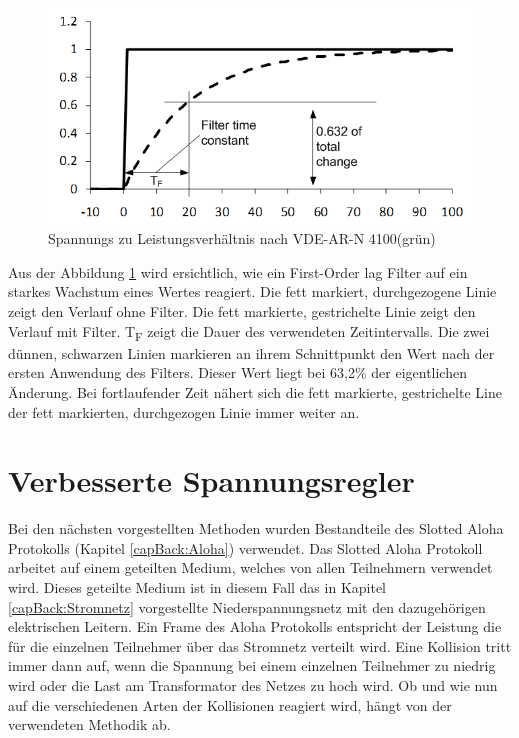 \begin{figure}[htb]
	\includegraphics[scale=0.75]{img/lag_Filter.png}
	\caption{Spannungs zu Leistungsverhältnis nach VDE-AR-N 4100(grün)}
	\label{Abb_lag_filter}
\end{figure}

Aus der Abbildung \ref{Abb_lag_filter} wird ersichtlich, wie ein First-Order lag Filter auf ein starkes Wachstum eines Wertes reagiert. Die fett markiert, durchgezogene Linie zeigt den Verlauf ohne Filter. Die fett markierte, gestrichelte Linie zeigt den Verlauf mit Filter. T\textsubscript{F} zeigt die Dauer des verwendeten Zeitintervalls. Die zwei dünnen, schwarzen Linien markieren an ihrem Schnittpunkt den Wert nach der ersten Anwendung des Filters. Dieser Wert liegt bei 63,2\% der eigentlichen Änderung. Bei fortlaufender Zeit nähert sich die fett markierte, gestrichelte Line der fett markierten, durchgezogen Linie immer weiter an.

\section{Verbesserte Spannungsregler}
Bei den nächsten vorgestellten Methoden wurden Bestandteile des Slotted Aloha Protokolls (Kapitel \ref{capBack:Aloha}) verwendet. Das Slotted Aloha Protokoll arbeitet auf einem geteilten Medium, welches von allen Teilnehmern verwendet wird. Dieses geteilte Medium ist in diesem Fall das in Kapitel \ref{capBack:Stromnetz} vorgestellte Niederspannungsnetz mit den dazugehörigen elektrischen Leitern. Ein Frame des Aloha Protokolls entspricht der Leistung die für die einzelnen Teilnehmer über das Stromnetz verteilt wird. Eine Kollision tritt immer dann auf, wenn die Spannung bei einem einzelnen Teilnehmer zu niedrig wird oder die Last am Transformator des Netzes zu hoch wird. Ob und wie nun auf die verschiedenen Arten der Kollisionen reagiert wird, hängt von der verwendeten Methodik ab.
